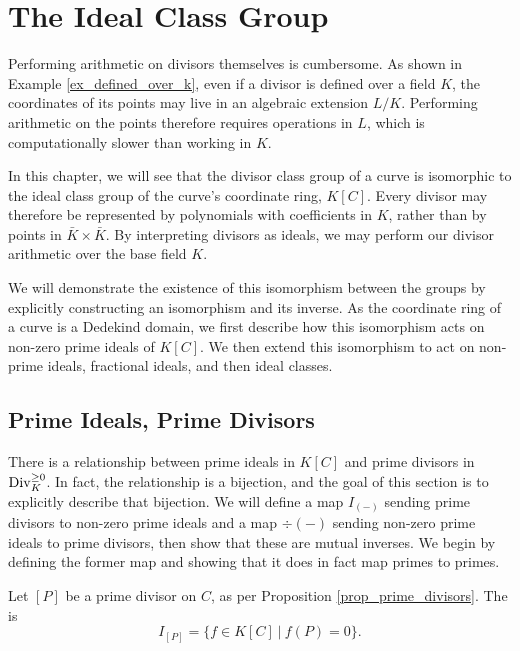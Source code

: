 
\section{The Ideal Class Group}
\label{chap_ideals}

Performing arithmetic on divisors themselves is cumbersome.
As shown in Example \ref{ex_defined_over_k},
even if a divisor is defined over a field $K$,
the coordinates of its points may live in an algebraic extension $L/K$.
Performing arithmetic on the points therefore requires operations in $L$,
which is computationally slower than working in $K$.

In this chapter, we will see that the divisor class group of a curve
is isomorphic to the ideal class group of the curve's coordinate ring, $K[C]$.
Every divisor may therefore be represented by polynomials with coefficients in $K$,
rather than by points in $\bar K \times \bar K$.
By interpreting divisors as ideals,
we may perform our divisor arithmetic over the base field $K$.

We will demonstrate the existence of this isomorphism between the groups
by explicitly constructing an isomorphism and its inverse.
As the coordinate ring of a curve is a Dedekind domain,
we first describe how this isomorphism acts on non-zero prime ideals of $K[C]$.
We then extend this isomorphism to act on non-prime ideals, fractional ideals, and then ideal classes.



\subsection{Prime Ideals, Prime Divisors}

There is a relationship between prime ideals in $K[C]$ and prime divisors in $\operatorname{Div}_K^{\geq 0}$.
In fact, the relationship is a bijection, and the goal of this section is to explicitly describe that bijection.
We will define a map $I_{(-)}$ sending prime divisors to non-zero prime ideals
and a map $\div(-)$ sending non-zero prime ideals to prime divisors, then show that these are mutual inverses.
We begin by defining the former map and showing that it does in fact map primes to primes.

\begin{definition}
  Let $[P]$ be a prime divisor on $C$, as per Proposition \ref{prop_prime_divisors}.
  The  is
  \[ I_{[P]} = \{ f \in K[C] ~|~ f(P) = 0 \}. \]
\end{definition}

